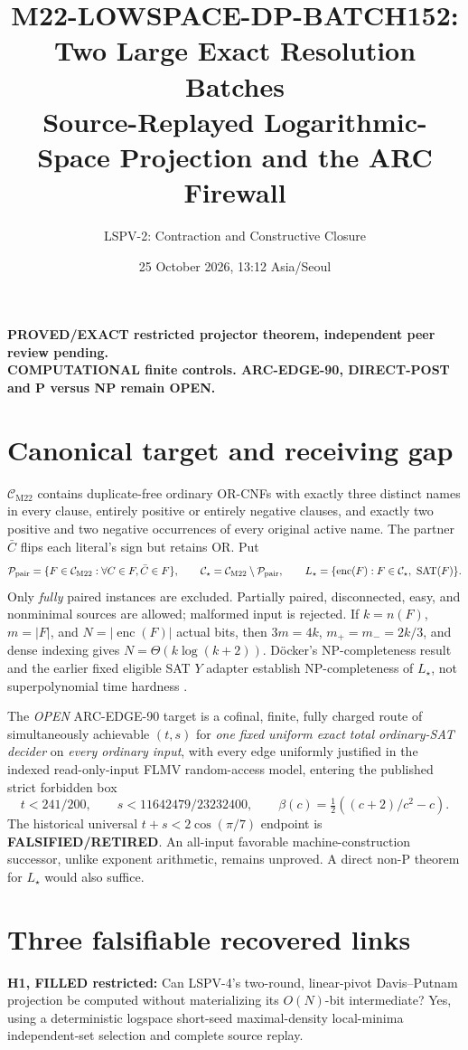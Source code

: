 \documentclass[11pt]{article}
\title{M22-LOWSPACE-DP-BATCH152: Two Large Exact Resolution Batches\\ Source-Replayed Logarithmic-Space Projection and the ARC Firewall}
\author{LSPV-2: Contraction and Constructive Closure}
\date{25 October 2026, 13:12 Asia/Seoul}
\newcommand{\CM}{\mathcal C_{\mathrm{M22}}}
\newcommand{\CS}{\mathcal C_\star}
\begin{document}
\maketitle
\begin{center}
\textbf{PROVED/EXACT restricted projector theorem, independent peer review pending.}\\
\textbf{COMPUTATIONAL finite controls. ARC-EDGE-90, DIRECT-POST and P versus NP remain OPEN.}
\end{center}

\section{Canonical target and receiving gap}
$\CM$ contains duplicate-free ordinary OR-CNFs with exactly three distinct names in every clause, entirely positive or entirely negative clauses, and exactly two positive and two negative occurrences of every original active name. The partner $\bar C$ flips each literal's sign but retains OR. Put
\[
\mathcal P_{\rm pair}=\{F\in\CM:\forall C\in F,\bar C\in F\},\qquad
\CS=\CM\setminus\mathcal P_{\rm pair},\qquad
L_\star=\{\operatorname{enc}(F):F\in\CS,\ \operatorname{SAT}(F)\}.
\]
Only \emph{fully} paired instances are excluded. Partially paired, disconnected, easy, and nonminimal sources are allowed; malformed input is rejected. If $k=n(F)$, $m=|F|$, and $N=|\operatorname{enc}(F)|$ actual bits, then $3m=4k$, $m_+=m_-=2k/3$, and dense indexing gives $N=\Theta(k\log(k+2))$. D\"ocker's NP-completeness result and the earlier fixed eligible SAT $Y$ adapter establish NP-completeness of $L_\star$, not superpolynomial time hardness \cite{docker}.

The \emph{OPEN} ARC-EDGE-90 target is a cofinal, finite, fully charged route of simultaneously achievable $(t,s)$ for \emph{one fixed uniform exact total ordinary-SAT decider} on \emph{every ordinary input}, with every edge uniformly justified in the indexed read-only-input FLMV random-access model, entering the published strict forbidden box
\[
t<241/200,\qquad s<11642479/23232400,\qquad
\beta(c)=\tfrac12((c+2)/c^2-c).
\]
The historical universal $t+s<2\cos(\pi/7)$ endpoint is \textbf{FALSIFIED/RETIRED}. An all-input favorable machine-construction successor, unlike exponent arithmetic, remains unproved. A direct non-P theorem for $L_\star$ would also suffice.

\section{Three falsifiable recovered links}
\noindent\textbf{H1, FILLED restricted:} Can LSPV-4's two-round, linear-pivot Davis--Putnam projection be computed without materializing its $O(N)$-bit intermediate? Yes, using a deterministic logspace short-seed maximal-density local-minima independent-set selection and complete source replay.
\end{document}
